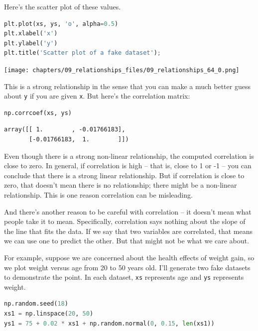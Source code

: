 Here's the scatter plot of these values.

\begin{lstlisting}[language=Python,style=source]
plt.plot(xs, ys, 'o', alpha=0.5)
plt.xlabel('x')
plt.ylabel('y')
plt.title('Scatter plot of a fake dataset');
\end{lstlisting}

\begin{center}
\texttt{[image: chapters/09\_relationships\_files/09\_relationships\_64\_0.png]}
\end{center}

This is a strong relationship in the sense that you can make a much
better guess about \passthrough{\lstinline!y!} if you are given
\passthrough{\lstinline!x!}. But here's the correlation matrix:

\begin{lstlisting}[language=Python,style=source]
np.corrcoef(xs, ys)
\end{lstlisting}

\begin{lstlisting}[style=output]
array([[ 1.        , -0.01766183],
       [-0.01766183,  1.        ]])
\end{lstlisting}

Even though there is a strong non-linear relationship, the computed
correlation is close to zero. In general, if correlation is high -- that
is, close to 1 or -1 -- you can conclude that there is a strong linear
relationship. But if correlation is close to zero, that doesn't mean
there is no relationship; there might be a non-linear relationship. This
is one reason correlation can be misleading.

And there's another reason to be careful with correlation -- it doesn't
mean what people take it to mean. Specifically, correlation says nothing
about the slope of the line that fits the data. If we say that two
variables are correlated, that means we can use one to predict the
other. But that might not be what we care about.

For example, suppose we are concerned about the health effects of weight
gain, so we plot weight versus age from 20 to 50 years old. I'll
generate two fake datasets to demonstrate the point. In each dataset,
\passthrough{\lstinline!xs!} represents age and
\passthrough{\lstinline!ys!} represents weight.

\begin{lstlisting}[language=Python,style=source]
np.random.seed(18)
xs1 = np.linspace(20, 50)
ys1 = 75 + 0.02 * xs1 + np.random.normal(0, 0.15, len(xs1))
\end{lstlisting}

